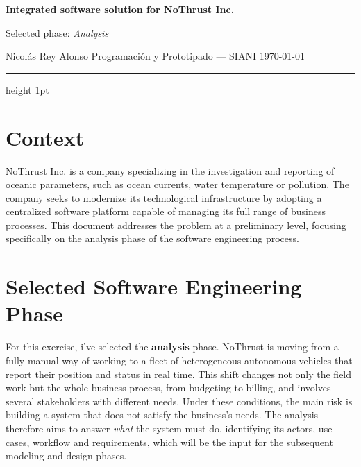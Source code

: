 \documentclass[11pt,a4paper]{article}
\newcommand{\miTitulo}{Integrated software solution for NoThrust Inc.}
\newcommand{\miSubtitulo}{Selected phase: \emph{Analysis}}
\newcommand{\miAutor}{Nicolás Rey Alonso}
\newcommand{\miAsignatura}{Programación y Prototipado --- SIANI}
\begin{document}
\begin{center}
  {\LARGE\bfseries\color{accent} \miTitulo\par}
  \vspace{0.3em}
  {\large\color{greytext} \miSubtitulo\par}
  \vspace{0.6em}
  {\normalsize \miAutor \;\textbar\; \miAsignatura \;\textbar\; \today\par}
\end{center}

\vspace{0.3em}
{\color{accent}\hrule height 1pt}
\vspace{1em}


\section{Context}

NoThrust Inc. is a company specializing in the investigation and reporting of
oceanic parameters, such as ocean currents, water temperature or pollution. The company
seeks to modernize its technological infrastructure by adopting a centralized
software platform capable of managing its full range of business processes.
This document addresses the problem at a preliminary level, focusing
specifically on the analysis phase of the software engineering process.



\section{Selected Software Engineering Phase}

For this exercise, i've selected the \textbf{analysis} phase. NoThrust
is moving from a fully manual way of working to a fleet of heterogeneous
 autonomous vehicles that report their position and status in real time. 
 This shift changes not only the field
work but the whole business process, from budgeting to billing, and
involves several stakeholders with different needs. Under these
conditions, the main risk is building a system that does not satisfy 
the business's needs.
The analysis therefore aims to answer \emph{what} the system must do,
identifying its actors, use cases, workflow and requirements, which will
be the input for the subsequent modeling and design phases.
\end{document}
